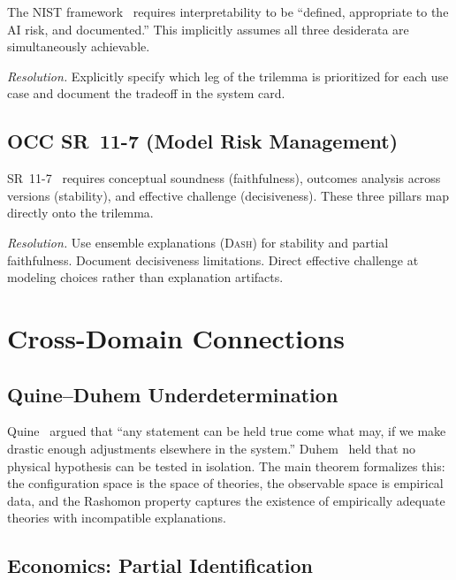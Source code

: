 \documentclass[11pt]{article}
\newcommand{\DASH}{\textsc{Dash}}
\begin{document}
The NIST framework~\cite{nistai2023} requires interpretability to be
``defined, appropriate to the AI risk, and documented.'' This implicitly
assumes all three desiderata are simultaneously achievable.

\emph{Resolution.} Explicitly specify which leg of the trilemma is
prioritized for each use case and document the tradeoff in the system
card.

\subsection{OCC SR~11-7 (Model Risk Management)}

SR~11-7~\cite{occ2011sr117} requires conceptual soundness (faithfulness),
outcomes analysis across versions (stability), and effective challenge
(decisiveness). These three pillars map directly onto the trilemma.

\emph{Resolution.} Use ensemble explanations (\DASH{}) for stability and
partial faithfulness. Document decisiveness limitations. Direct effective
challenge at modeling choices rather than explanation artifacts.


\section{Cross-Domain Connections}
\label{sec:si-cross-domain}

\subsection{Quine--Duhem Underdetermination}

Quine~\cite{quine1951dogmas} argued that ``any statement can be held true
come what may, if we make drastic enough adjustments elsewhere in the
system.'' Duhem~\cite{duhem1906aim} held that no physical hypothesis can
be tested in isolation. The main theorem formalizes this: the configuration
space is the space of theories, the observable space is empirical data,
and the Rashomon property captures the existence of empirically adequate
theories with incompatible explanations.

\subsection{Economics: Partial Identification}
\end{document}
